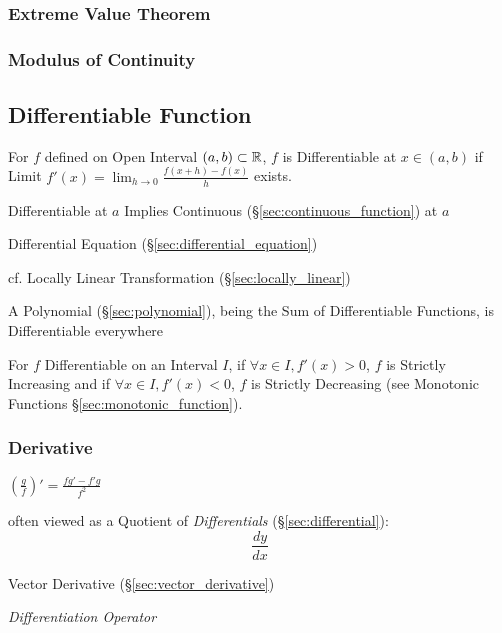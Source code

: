 \subsubsection{Extreme Value Theorem}\label{sec:extreme_value}

\subsubsection{Modulus of Continuity}\label{sec:continuity_modulus}



\subsection{Differentiable Function}\label{sec:differentiable_function}

For $f$ defined on Open Interval $(a,b) \subset \mathbb{R}$, $f$ is
Differentiable at $x \in (a,b)$ if Limit $f'(x) = \lim_{h \rightarrow
  0} \frac{f (x+h) - f(x)}{h}$ exists.

Differentiable at $a$ Implies Continuous (\S\ref{sec:continuous_function}) at
$a$

\fist Differential Equation (\S\ref{sec:differential_equation})

\fist cf. Locally Linear Transformation (\S\ref{sec:locally_linear})

A Polynomial (\S\ref{sec:polynomial}), being the Sum of Differentiable
Functions, is Differentiable everywhere

For $f$ Differentiable on an Interval $I$, if $\forall x \in I, f'(x)
> 0$, $f$ is Strictly Increasing and if $\forall x \in I, f'(x) < 0$,
$f$ is Strictly Decreasing (see Monotonic Functions
\S\ref{sec:monotonic_function}).



\subsubsection{Derivative}\label{sec:derivative}

$(\frac{g}{f})' = \frac{f g' - f' g}{f^2}$

often viewed as a Quotient of \emph{Differentials} (\S\ref{sec:differential}):
\[
  \frac{dy}{dx}
\]

\fist Vector Derivative (\S\ref{sec:vector_derivative})

\emph{Differentiation Operator}

